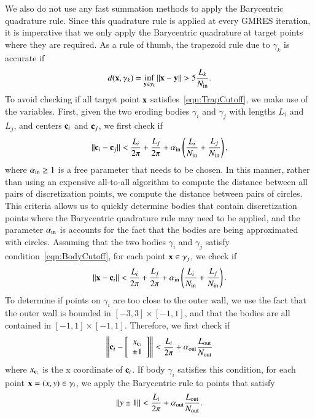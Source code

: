 \documentclass[preprint, 10pt]{elsarticle}
\begin{document}
We also do not use any fast summation methods to apply the Barycentric
quadrature rule.  Since this quadrature rule is applied at every GMRES
iteration, it is imperative that we only apply the Barycentric
quadrature at target points where they are required.  As a rule of
thumb, the trapezoid rule due to $\gamma_k$ is accurate if
\begin{align}
  \label{eqn:TrapCutoff}
  d({\mathbf{x}},\gamma_k) = \inf_{{\mathbf{y}} \in \gamma_k} \|{\mathbf{x}} - {\mathbf{y}}\| > 
    5 \frac{L_k}{N_{\mathrm{in}}}.
\end{align}
To avoid checking if all target point ${\mathbf{x}}$
satisfies~\eqref{eqn:TrapCutoff}, we make use of the {\thL} variables.
First, given the two eroding bodies $\gamma_i$ and $\gamma_j$ with
lengths $L_i$ and $L_j$, and centers ${\mathbf{c}}_i$ and ${\mathbf{c}}_j$, we first check
if
\begin{align}
  \label{eqn:BodyCutoff}
  \|{\mathbf{c}}_i - {\mathbf{c}}_j\| < \frac{L_i}{2\pi} + \frac{L_j}{2\pi} + 
    \alpha_{\mathrm{in}} \left(\frac{L_i}{N_{\mathrm{in}}} + \frac{L_j}{N_{\mathrm{in}}} \right),
\end{align}
where $\alpha_{\mathrm{in}} \geq 1$ is a free parameter that needs to be chosen.
In this manner, rather than using an expensive all-to-all algorithm to
compute the distance between all pairs of discretization points, we
compute the distance between pairs of circles.  This criteria allows us
to quickly determine bodies that contain discretization points where the
Barycentric quadrature rule may need to be applied, and the parameter
$\alpha_{\mathrm{in}}$ is accounts for the fact that the bodies are being
approximated with circles.  Assuming that the two bodies $\gamma_i$ and
$\gamma_j$ satisfy condition~\eqref{eqn:BodyCutoff}, for each point ${\mathbf{x}}
\in \gamma_j$, we check if
{\color{red}
\begin{align}
  \label{eqn:PointsBodyCutoff}
  \|{\mathbf{x}} - {\mathbf{c}}_i\| < \frac{L_i}{2\pi} + \frac{L_j}{2\pi}
+ \alpha_{\mathrm{in}} \left(\frac{L_i}{N_{\mathrm{in}}} + \frac{L_j}{N_{\mathrm{in}}} \right).
\end{align}
}
To determine if points on $\gamma_i$ are too close to the outer wall, we
use the fact that the outer wall is bounded in $[-3,3] \times [-1,1]$,
and that the bodies are all contained in $[-1,1] \times [-1,1]$.
Therefore, we first check if
{\color{red}
\begin{align}
  \left\|{\mathbf{c}}_i - \left[
    \begin{array}{c}
      x_{{\mathbf{c}}_i } \\ \pm 1
    \end{array}
    \right]
  \right\| < \frac{L_i}{2 \pi} + \alpha_{\mathrm{out}} \frac{L_{\mathrm{out}}}{N_{\mathrm{out}}}
\end{align}
where $x_{{\mathbf{c}}_i } $ is the x coordinate of ${\mathbf{c}}_i$.}
If body $\gamma_i$ satisfies this condition, for each point {\color{red}${\mathbf{x}}=(x,y) \in
\gamma_i$}, we apply the Barycentric rule to points that satisfy
{\color{red}
\begin{align}
  \label{eqn:PointsWallCutoff}
  \|y \pm 1\| <  \frac{L_i}{2 \pi} +\alpha_{\mathrm{out}} \frac{L_{\mathrm{out}}}{N_{\mathrm{out}}}.
\end{align}}
\end{document}
